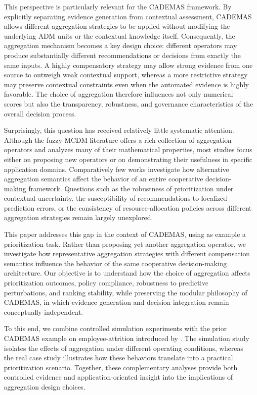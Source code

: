 \documentclass[mathematics,article,submit,moreauthors]{Definitions/mdpi}
\begin{document}
This perspective is particularly relevant for the CADEMAS framework. By explicitly separating evidence generation from contextual assessment, CADEMAS allows different aggregation strategies to be applied without modifying the underlying ADM units or the contextual knowledge itself. Consequently, the aggregation mechanism becomes a key design choice: different operators may produce substantially different recommendations or decisions from exactly the same inputs. A highly compensatory strategy may allow strong evidence from one source to outweigh weak contextual support, whereas a more restrictive strategy may preserve contextual constraints even when the automated evidence is highly favorable. The choice of aggregation therefore influences not only numerical scores but also the transparency, robustness, and governance characteristics of the overall decision process.

Surprisingly, this question has received relatively little systematic attention. Although the fuzzy MCDM literature offers a rich collection of aggregation operators and analyzes many of their mathematical properties, most studies focus either on proposing new operators or on demonstrating their usefulness in specific application domains. Comparatively few works investigate how alternative aggregation semantics affect the behavior of an entire cooperative decision-making framework. Questions such as the robustness of prioritization under contextual uncertainty, the susceptibility of recommendations to localized prediction errors, or the consistency of resource-allocation policies across different aggregation strategies remain largely unexplored.

This paper addresses this gap in the context of CADEMAS, using as example a prioritization task. Rather than proposing yet another aggregation operator, we investigate how representative aggregation strategies with different compensation semantics influence the behavior of the same cooperative decision-making architecture. Our objective is to understand how the choice of aggregation affects prioritization outcomes, policy compliance, robustness to predictive perturbations, and ranking stability, while preserving the modular philosophy of CADEMAS, in which evidence generation and decision integration remain conceptually independent.

To this end, we combine controlled simulation experiments with the prior CADEMAS example on  employee-attrition introduced by \citet{Godz2026}. The simulation study isolates the effects of aggregation under different operating conditions, whereas the real case study illustrates how these behaviors translate into a practical prioritization scenario. Together, these complementary analyses provide both controlled evidence and application-oriented insight into the implications of aggregation design choices.
\end{document}
